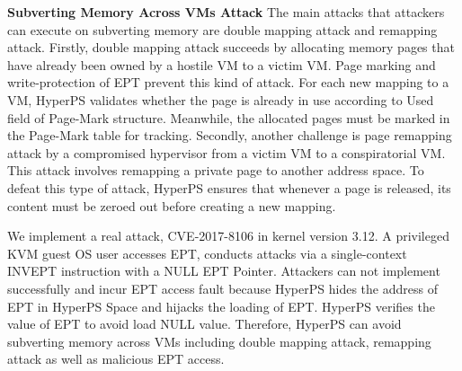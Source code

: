 



\textbf{Subverting Memory Across VMs Attack}
%
The main attacks that attackers can execute on subverting memory are double mapping attack and remapping attack.
Firstly, double mapping attack succeeds by allocating memory pages that have already been owned by a hostile VM to a victim VM. Page marking and write-protection of EPT prevent this kind of attack. For each new mapping to a VM, HyperPS validates whether the page is already in use according to Used field of Page-Mark structure. Meanwhile, the allocated pages must be marked in the Page-Mark table for tracking. Secondly, another challenge is page remapping attack by a compromised hypervisor from a victim VM to a conspiratorial VM. This attack involves remapping a private page to another address space. To defeat this type of attack, HyperPS ensures that whenever a page is released, its content must be zeroed out before creating a new mapping.


We implement a real attack, CVE-2017-8106 in kernel version 3.12. A privileged KVM guest OS user accesses EPT, conducts attacks via a single-context INVEPT instruction with a NULL EPT Pointer. Attackers can not implement successfully and incur EPT access fault because HyperPS hides the address of EPT in HyperPS Space and hijacks the loading of EPT. HyperPS verifies the value of EPT to avoid load NULL value. Therefore, HyperPS can avoid subverting memory across VMs including double mapping attack, remapping attack as well as malicious EPT access.


